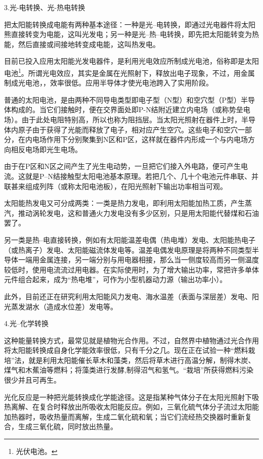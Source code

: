 \documentclass{ctexbook}
\begin{document}
3.光-电转换、光-热电转换

把太阳能转换成电能有两种基本途径：一种是光--电转换，即通过光电器件将太阳熊直接转变为电能，这叫光发电；另一种是光--热--电转换，即先把太阳能转变为热能，然后直接或间接地转变成电能，这叫热发电。

目前已投入应用太阳能光发电器件，是利用光电效应所制成光电池，俗称即是太阳电池\footnote{光伏电池。}。所谓光电效应，其实是金属在光照射下，释放出电子现象，不过，用金属制成光电池，，效率很低。应用半导体才使光电池跨入了实用阶段。

普通的太阳电池，是由两种不同导电类型即电子型（N型）和空穴型（P型）半导体构成的。当它们接触时，便在交界面处即P-N结附近建立内电场（或称势垒电场）。由于此处电阻特别高，所以也称为阻挡层。当太阳光照射在器件上时，半导体内原子由于获得了光能而释放了电子，相对应产生空穴。这些电子和空穴一部分，在内电场作用下分别聚集到N区和P区，这样就在器件内形成一个与内电场方向相反电场即光生电场。

由于在P区和N区之间产生了光生电动势，一旦把它们接入外电路，便可产生电流。这就是P--N结接触型太阳电池基本原理。若把几个、几十个电池元件串联、并联甚来组成列阵（或称太阳电池板），在阳光照射下输出功率相当可观。

太阳能热发电又可分成两类：一类是热力发电，即利用太阳能加热工质，产生蒸汽，推动涡轮发电，这和普通火力发电没有多少区别，只是用太阳能代替煤和石油罢了。

另一类是热--电直接转换，例如有太阳能温差电偶（热电堆）发电、太阳能热电子（或热离子）发电、太阳能磁流体发电等。温差电偶发电原理是将两种不同类型半导体一端用金属连接，另一端分别与用电器相接，那么当一侧度较高而另一侧温度较低时，使用电流流过用电器。在实际使用时，为了增大输出功率，常把许多单体元件组合起来，成为“热电堆”，可作为小型机器动力源（输出功率小）。


此外，目前还正在研究利用太阳能风力发电、海水温差（表面与深层差）发电、阳光蒸发湖水（造成水位差）发电等。

4.光--化学转换

这种能量转换方式，最常见就是植物光合作用。不过，自然界中植物通过光合作用将太阳能转换成自身化学能效率很低，只有千分之几。现在正在试验一种“燃料栽培”法，就是利用太阳能催长草木和藻类，然后将草木进行高温分解，制得木炭、煤气和木蕉油等燃料；将藻类进行发酵,制得沼气和氢气。“栽培”所获得燃料污染很少并且可再生。

光化反应是一种把光能转换成化学能途径。这是指某种气体分子在太阳光照射下吸热离解、在复合时释放出所吸收太阳能反应。例如，三氧化硫气体分子流过太阳能加热器时，吸收热量而离解，生成二氧化硫和氧；当它们流经热交换器时重新复合，生成三氧化硫，同时放出热量。
\end{document}
